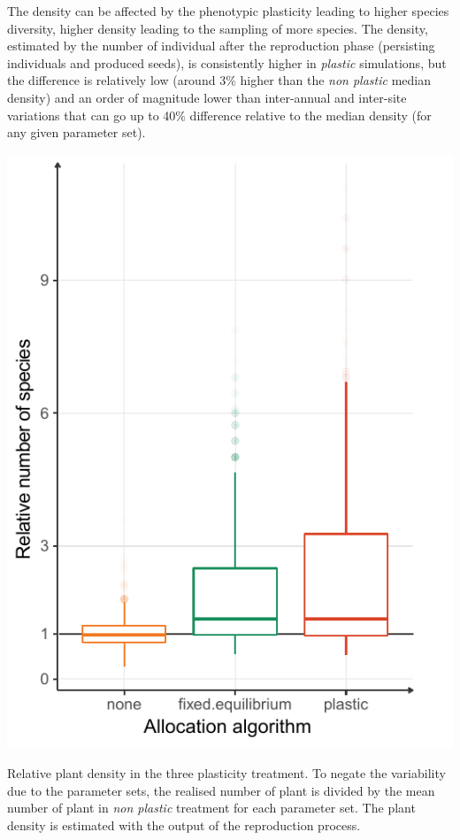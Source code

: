 The density can be affected by the phenotypic plasticity leading to higher species diversity\cite{lepik_high_2005}, higher density leading to the sampling of more species. The density, estimated by the number of individual after the reproduction phase (persisting individuals and produced seeds), is consistently higher in \textit{plastic} simulations, but the difference is relatively low (around 3\% higher than the \textit{non plastic} median density) and an order of magnitude lower than inter-annual and inter-site variations that can go up to 40\% difference relative to the median density (for any given parameter set).


\begin{marginfigure}\label{fig:tiller_density}
\includegraphics[]{./2_PP/Figures/Comm/comm_n_sp_differences.pdf}
\caption[Relative plant density in plasticity treatments]{Relative plant density in the three plasticity treatment. To negate the variability due to the parameter sets, the realised number of plant is divided by the mean number of plant in \textit{non plastic} treatment for each parameter set. The plant density is estimated with the output of the reproduction process.}
\end{marginfigure}

